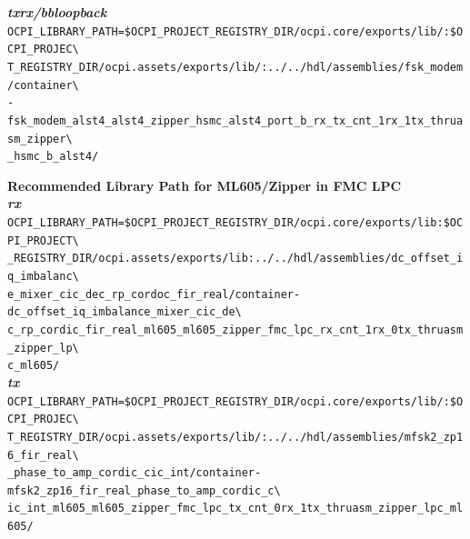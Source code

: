 \noindent\textbf{\textit{txrx/bbloopback}}\\
\verb|OCPI_LIBRARY_PATH=$OCPI_PROJECT_REGISTRY_DIR/ocpi.core/exports/lib/:$OCPI_PROJEC\| \\
\verb|T_REGISTRY_DIR/ocpi.assets/exports/lib/:../../hdl/assemblies/fsk_modem/container\| \\
\verb|-fsk_modem_alst4_alst4_zipper_hsmc_alst4_port_b_rx_tx_cnt_1rx_1tx_thruasm_zipper\| \\
\verb|_hsmc_b_alst4/| \\
\par\medskip
\pagebreak

\noindent\textbf{Recommended Library Path for ML605/Zipper in FMC LPC}\\

\noindent\textbf{\textit{rx}}\\
\verb|OCPI_LIBRARY_PATH=$OCPI_PROJECT_REGISTRY_DIR/ocpi.core/exports/lib:$OCPI_PROJECT\| \\
\verb|_REGISTRY_DIR/ocpi.assets/exports/lib:../../hdl/assemblies/dc_offset_iq_imbalanc\| \\
\verb|e_mixer_cic_dec_rp_cordoc_fir_real/container-dc_offset_iq_imbalance_mixer_cic_de\| \\
\verb|c_rp_cordic_fir_real_ml605_ml605_zipper_fmc_lpc_rx_cnt_1rx_0tx_thruasm_zipper_lp\| \\
\verb|c_ml605/|\\


\noindent\textbf{\textit{tx}}\\
\verb|OCPI_LIBRARY_PATH=$OCPI_PROJECT_REGISTRY_DIR/ocpi.core/exports/lib/:$OCPI_PROJEC\| \\
\verb|T_REGISTRY_DIR/ocpi.assets/exports/lib/:../../hdl/assemblies/mfsk2_zp16_fir_real\| \\
\verb|_phase_to_amp_cordic_cic_int/container-mfsk2_zp16_fir_real_phase_to_amp_cordic_c\| \\
\verb|ic_int_ml605_ml605_zipper_fmc_lpc_tx_cnt_0rx_1tx_thruasm_zipper_lpc_ml605/| \\

